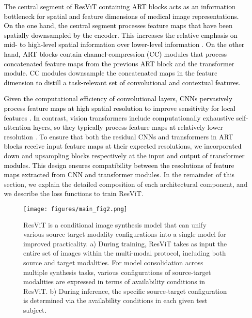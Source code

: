 \documentclass[journal,twoside,web]{ieeecolor}
\newcommand*{\revhl}{\textcolor{black}}
\begin{document}
\revhl{The central segment of ResViT containing ART blocks acts as an information bottleneck for spatial and feature dimensions of medical image representations. On the one hand, the central segment processes feature maps that have been spatially downsampled by the encoder. This increases the relative emphasis on mid- to high-level spatial information over lower-level information \cite{resnet}. On the other hand, ART blocks contain channel-compression (CC) modules that process concatenated feature maps from the previous ART block and the transformer module. CC modules downsample the concatenated maps in the feature dimension to distill a task-relevant set of convolutional and contextual features.} 

\revhl{Given the computational efficiency of convolutional layers, CNNs pervasively process feature maps at high spatial resolution to improve sensitivity for local features \cite{resnet}. In contrast, vision transformers include computationally exhaustive self-attention layers, so they typically process feature maps at relatively lower resolution \cite{vit}. To ensure that both the residual CNNs and transformers in ART blocks receive input feature maps at their expected resolutions, we incorporated down and upsampling blocks respectively at the input and output of transformer modules. This design ensures compatibility between the resolutions of feature maps extracted from CNN and transformer modules.} In the remainder of this section, we explain the detailed composition of each architectural component, and we describe the loss functions to train ResViT.  

\begin{figure*}[!t]
\vspace{-2.5ex}
\centerline{\texttt{[image: figures/main\_fig2.png]}}
\caption{ResViT is a conditional image synthesis model that can unify various source-target modality configurations into a single model for improved practicality. a) During training, ResViT takes as input the entire set of images within the multi-modal protocol, including both source and target modalities. For model consolidation across multiple synthesis tasks, various configurations of source-target modalities are expressed in terms of availability conditions in ResViT. b) During inference, the specific source-target configuration is determined via the availability conditions in each given test subject.}
\label{fig:main_fig2}
\vspace{-3.5ex}
\end{figure*}
\end{document}
